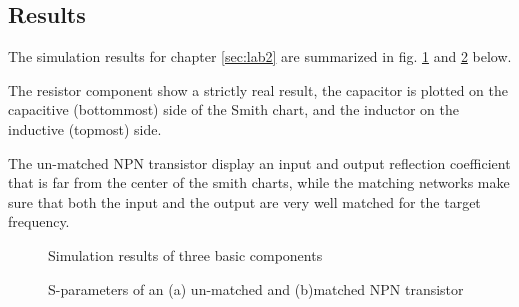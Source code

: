 \documentclass[report.tex]{subfiles}
\begin{document}
\clearpage
\subsection{Results}
\label{sec:lab2_results}
The simulation results for chapter \ref{sec:lab2} are summarized in fig. \ref{fig:basic_components} and \ref{fig:npn_transistor} below.

The resistor component show a strictly real result, the capacitor is plotted on the capacitive (bottommost) side of the Smith chart, and the inductor on the inductive (topmost) side.

The un-matched NPN transistor display an input and output reflection coefficient that is far from the center of the smith charts, while the matching networks make sure that both the input and the output are very well matched for the target frequency.

\vspace*{\fill}
\begin{figure}[h]
    \centering
    \caption{Simulation results of three basic components}
    \label{fig:basic_components}
\end{figure}
\vspace*{\fill}

\clearpage

\begin{figure}
    \centering
    \caption{S-parameters of an (a) un-matched and (b)matched NPN transistor}
    \label{fig:npn_transistor}
\end{figure}
\end{document}
